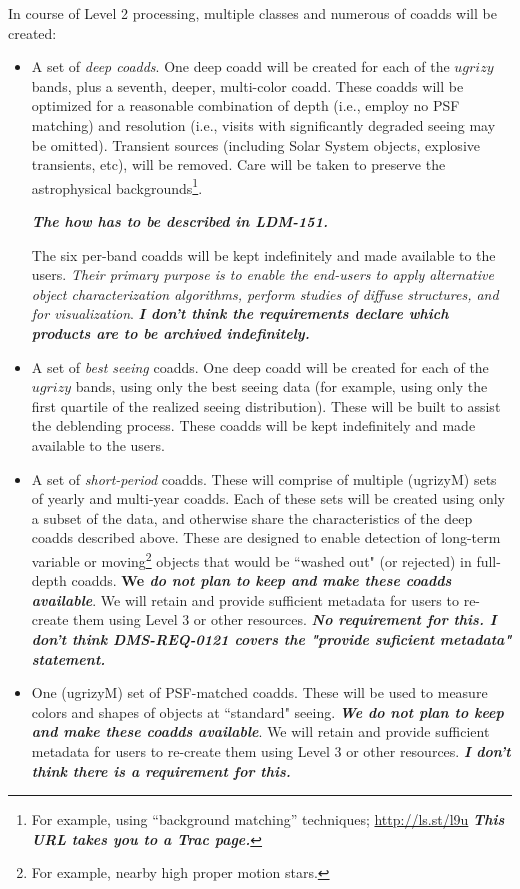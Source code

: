 \documentclass[12pt]{article}
\newcommand{\annotate}[1]{{\color{magenta}\large\textbf{\emph{#1}}}}
\newcommand{\req}[1]{\marginpar{\tiny #1}}
\newcommand{\dmreq}[1]{\req{DMS-REQ-#1}}
\begin{document}
In course of Level 2 processing, multiple classes and numerous of coadds will be created:
    \begin{itemize}
        \item A set of {\em deep coadds}.\dmreq{0279} One deep coadd will be created for each of the $ugrizy$ bands, plus a seventh, deeper, multi-color coadd.\dmreq{0281} These coadds will be optimized for a reasonable combination of depth (i.e., employ no PSF matching) and resolution (i.e., visits with significantly degraded seeing may be omitted). Transient sources (including Solar System objects, explosive transients, etc), will be removed. Care will be taken to preserve the astrophysical backgrounds\footnote{For example, using ``background matching'' techniques; \url{http://ls.st/l9u} \annotate{This URL takes you to a Trac page.}}.

\annotate{The how has to be described in LDM-151.}

        The six per-band coadds will be kept indefinitely and made available to the users. {\em Their primary purpose is to enable the end-users to apply alternative object characterization algorithms, perform studies of diffuse structures, and for visualization}. \annotate{I don't think the requirements declare which products are to be archived indefinitely.}

               \item A set of {\em best seeing} coadds. One deep coadd will be created for each of the $ugrizy$ bands, using only the best seeing data (for example, using only the first quartile of the realized seeing distribution). These will be built to assist the deblending process. These coadds will be kept indefinitely and made available to the users. \dmreq{0330}

               \item A set of {\em short-period} coadds. These will comprise of multiple (ugrizyM) sets of yearly and multi-year coadds. Each of these sets will be created using only a subset of the data, and otherwise share the characteristics of the deep coadds described above. These are designed to enable detection of long-term variable or moving\footnote{For example, nearby high proper motion stars.} objects that would be ``washed out" (or rejected) in full-depth coadds. {\bf We \em do not plan to keep and make these coadds available}. We will retain and provide sufficient metadata for users to re-create them using Level 3 or other resources. \annotate{No requirement for this. I don't think DMS-REQ-0121 covers the "provide suficient metadata" statement.} \dmreq{0298}

        \item One (ugrizyM) set of PSF-matched coadds. These will be used to measure colors and shapes of objects at ``standard" seeing. {\bf \em We do not plan to keep and make these coadds available}. We will retain and provide sufficient metadata for users to re-create them using Level 3 or other resources. \annotate{I don't think there is a requirement for this.}
    \end{itemize}
\end{document}
